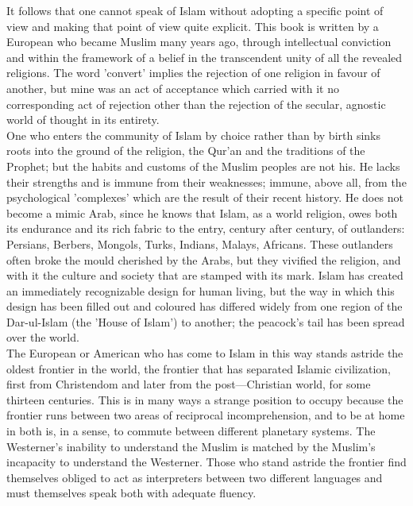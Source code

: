 \documentclass[11pt, b5paper, twoside]{book}
\begin{document}
It follows that one cannot speak of Islam without adopting a specific point of view and making that point of view quite explicit. This book is written by a European who became Muslim many years ago, through intellectual conviction and within the framework of a belief in the transcendent unity of all the revealed religions. The word 'convert' implies the rejection of one religion in favour of another, but mine was an act of acceptance which carried with it no corresponding act of rejection other than the rejection of the secular, agnostic world of thought in its entirety. \\

One who enters the community of Islam by choice rather than by birth sinks roots into the ground of the religion, the Qur'an and the traditions of the Prophet; but the habits and customs of the Muslim peoples are not his. He lacks their strengths and is immune from their weaknesses; immune, above all, from the psychological 'complexes' which are the result of their recent history. He does not become a mimic Arab, since he knows that Islam, as a world religion, owes both its endurance and its rich fabric to the entry, century after century, of outlanders: Persians, Berbers, Mongols, Turks, Indians, Malays, Africans. These outlanders often broke the mould cherished by the Arabs, but they vivified the religion, and with it the culture and society that are stamped with its mark. Islam has created an immediately recognizable design for human living, but the way in which this design has been filled out and coloured has differed widely from one region of the Dar-ul-Islam (the 'House of Islam') to another; the peacock's tail has been spread over the world. \\

The European or American who has come to Islam in this way stands astride the oldest frontier in the world, the frontier that has separated Islamic civilization, first from Christendom and later from the post---Christian world, for some thirteen centuries. This is in many ways a strange position to occupy because the frontier runs between two areas of reciprocal incomprehension, and to be at home in both is, in a sense, to commute between different planetary systems. The Westerner's inability to understand the Muslim is matched by the Muslim's incapacity to understand the Westerner. Those who stand astride the frontier find themselves obliged to act as interpreters between two different languages and must themselves speak both with adequate fluency. \\
\end{document}
